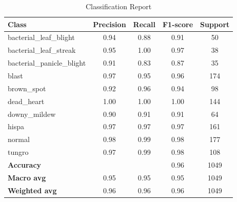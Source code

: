 \documentclass[conference]{IEEEtran}
\begin{document}
\begin{table}[H]
    \centering
    \captionsetup{skip=5pt}
    \begin{tabular}{lcccc}
    \hline
    \textbf{Class}                  & \textbf{Precision} & \textbf{Recall} & \textbf{F1-score} & \textbf{Support} \\ \hline
    bacterial\_leaf\_blight        & 0.94               & 0.88            & 0.91              & 50               \\
    bacterial\_leaf\_streak        & 0.95               & 1.00            & 0.97              & 38               \\
    bacterial\_panicle\_blight     & 0.91               & 0.83            & 0.87              & 35               \\
    blast                          & 0.97               & 0.95            & 0.96              & 174              \\
    brown\_spot                    & 0.92               & 0.96            & 0.94              & 98               \\
    dead\_heart                    & 1.00               & 1.00            & 1.00              & 144              \\
    downy\_mildew                  & 0.90               & 0.91            & 0.91              & 64               \\
    hispa                          & 0.97               & 0.97            & 0.97              & 161              \\
    normal                         & 0.98               & 0.99            & 0.98              & 177              \\
    tungro                         & 0.97               & 0.99            & 0.98              & 108              \\ \hline
    \textbf{Accuracy}               &                    &                 & 0.96              & 1049             \\
    \textbf{Macro avg}              & 0.95               & 0.95            & 0.95              & 1049             \\
    \textbf{Weighted avg}           & 0.96               & 0.96            & 0.96              & 1049             \\ \hline
    \end{tabular}
    \caption{Classification Report}
    \label{tab:classification_report}
\end{table}
\end{document}
